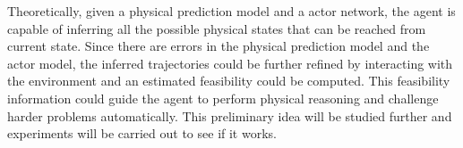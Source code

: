 \documentclass[a4paper, 12pt]{report}
\begin{document}
Theoretically, given a physical prediction model and a actor network, the agent is capable of inferring all the possible physical states that can be reached from current state. Since there are errors in the physical prediction model and the actor model, the inferred trajectories could be further refined by interacting with the environment and an estimated feasibility could be computed. This feasibility information could guide the agent to perform physical reasoning and challenge harder problems automatically. This preliminary idea will be studied further and experiments will be carried out to see if it works.



{}

\end{document}
